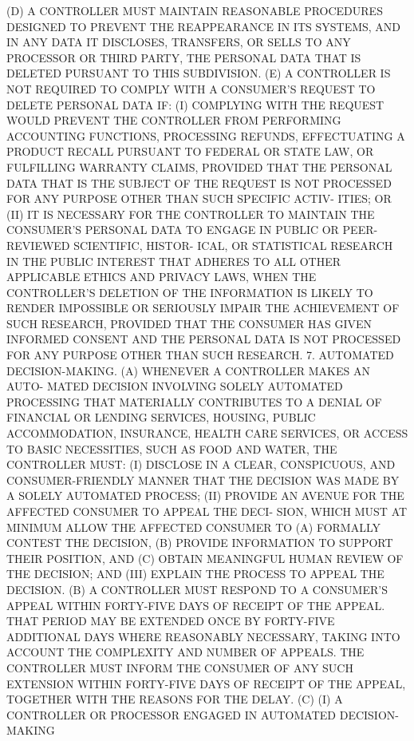    (D) A CONTROLLER  MUST  MAINTAIN  REASONABLE  PROCEDURES  DESIGNED  TO
 PREVENT  THE  REAPPEARANCE IN ITS SYSTEMS, AND IN ANY DATA IT DISCLOSES,
 TRANSFERS, OR SELLS TO ANY PROCESSOR OR THIRD PARTY, THE  PERSONAL  DATA
 THAT IS DELETED PURSUANT TO THIS SUBDIVISION.
   (E)  A  CONTROLLER IS NOT REQUIRED TO COMPLY WITH A CONSUMER'S REQUEST
 TO DELETE PERSONAL DATA IF:
   (I) COMPLYING WITH THE  REQUEST  WOULD  PREVENT  THE  CONTROLLER  FROM
 PERFORMING  ACCOUNTING  FUNCTIONS,  PROCESSING  REFUNDS,  EFFECTUATING A
 PRODUCT RECALL PURSUANT TO FEDERAL OR STATE LAW, OR FULFILLING  WARRANTY
 CLAIMS,  PROVIDED  THAT  THE  PERSONAL  DATA  THAT IS THE SUBJECT OF THE
 REQUEST IS NOT PROCESSED FOR ANY PURPOSE OTHER THAN SUCH SPECIFIC ACTIV-
 ITIES; OR
   (II) IT IS NECESSARY FOR THE CONTROLLER  TO  MAINTAIN  THE  CONSUMER'S
 PERSONAL  DATA  TO ENGAGE IN PUBLIC OR PEER-REVIEWED SCIENTIFIC, HISTOR-
 ICAL, OR STATISTICAL RESEARCH IN THE PUBLIC INTEREST THAT ADHERES TO ALL
 OTHER APPLICABLE ETHICS AND PRIVACY LAWS, WHEN THE CONTROLLER'S DELETION
 OF THE INFORMATION IS LIKELY TO RENDER IMPOSSIBLE  OR  SERIOUSLY  IMPAIR
 THE  ACHIEVEMENT  OF SUCH RESEARCH, PROVIDED THAT THE CONSUMER HAS GIVEN
 INFORMED CONSENT AND THE PERSONAL DATA IS NOT PROCESSED FOR ANY  PURPOSE
 OTHER THAN SUCH RESEARCH.
   7. AUTOMATED DECISION-MAKING. (A) WHENEVER A CONTROLLER MAKES AN AUTO-
 MATED  DECISION  INVOLVING  SOLELY  AUTOMATED PROCESSING THAT MATERIALLY
 CONTRIBUTES TO A DENIAL  OF  FINANCIAL  OR  LENDING  SERVICES,  HOUSING,
 PUBLIC  ACCOMMODATION,  INSURANCE,  HEALTH  CARE  SERVICES, OR ACCESS TO
 BASIC NECESSITIES, SUCH AS FOOD AND WATER, THE CONTROLLER MUST:
   (I) DISCLOSE IN A CLEAR,  CONSPICUOUS,  AND  CONSUMER-FRIENDLY  MANNER
 THAT THE DECISION WAS MADE BY A SOLELY AUTOMATED PROCESS;
   (II)  PROVIDE  AN AVENUE FOR THE AFFECTED CONSUMER TO APPEAL THE DECI-
 SION, WHICH MUST AT MINIMUM ALLOW THE AFFECTED CONSUMER TO (A)  FORMALLY
 CONTEST THE DECISION, (B) PROVIDE INFORMATION TO SUPPORT THEIR POSITION,
 AND (C) OBTAIN MEANINGFUL HUMAN REVIEW OF THE DECISION; AND
   (III) EXPLAIN THE PROCESS TO APPEAL THE DECISION.
   (B) A CONTROLLER MUST RESPOND TO A CONSUMER'S APPEAL WITHIN FORTY-FIVE
 DAYS  OF  RECEIPT  OF  THE  APPEAL.  THAT PERIOD MAY BE EXTENDED ONCE BY
 FORTY-FIVE ADDITIONAL  DAYS  WHERE  REASONABLY  NECESSARY,  TAKING  INTO
 ACCOUNT THE COMPLEXITY AND NUMBER OF APPEALS. THE CONTROLLER MUST INFORM
 THE  CONSUMER OF ANY SUCH EXTENSION WITHIN FORTY-FIVE DAYS OF RECEIPT OF
 THE APPEAL, TOGETHER WITH THE REASONS FOR THE DELAY.
   (C) (I) A CONTROLLER OR PROCESSOR ENGAGED IN AUTOMATED DECISION-MAKING
